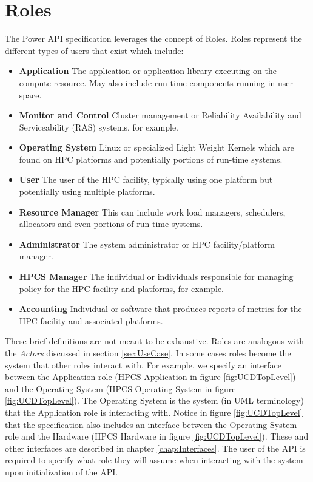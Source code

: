 \section{Roles}\label{sec:Roles}

The Power API specification leverages the concept of Roles. 
Roles represent the different types of users that exist which include:
\begin{itemize}[noitemsep,nolistsep] %
\item{\textbf{Application}  The application or application library executing on the compute resource. May also include run-time components running in user space.}
\item{\textbf{Monitor and Control}  Cluster management or Reliability Availability and Serviceability (RAS) systems, for example.}
\item{\textbf{Operating System} Linux or specialized Light Weight Kernels which are found on HPC platforms and potentially portions of run-time systems. }
\item{\textbf{User} The user of the HPC facility, typically using one platform but potentially using multiple platforms. }
\item{\textbf{Resource Manager} This can include work load managers, schedulers, allocators and even portions of run-time systems. }
\item{\textbf{Administrator} The system administrator or HPC facility/platform manager. }
\item{\textbf{HPCS Manager} The individual or individuals responsible for managing policy for the HPC facility and platforms, for example. }
\item{\textbf{Accounting} Individual or software that produces reports of metrics for the HPC facility and associated platforms. }
\end{itemize}
These brief definitions are not meant to be exhaustive.
Roles are analogous with the \textit{Actors} discussed in section \ref{sec:UseCase}.
In some cases roles become the system that other roles interact with.
For example, we specify an interface between the Application role (HPCS Application in figure \ref{fig:UCDTopLevel}) and the Operating System (HPCS Operating System in figure \ref{fig:UCDTopLevel}).
The Operating System is the system (in UML terminology) that the Application role is interacting with. 
Notice in figure \ref{fig:UCDTopLevel} that the specification also includes an interface between the Operating System role and the Hardware (HPCS Hardware in figure \ref{fig:UCDTopLevel}).
These and other interfaces are described in chapter \ref{chap:Interfaces}.
The user of the API is required to specify what role they will assume when interacting with the system upon initialization of the API.

